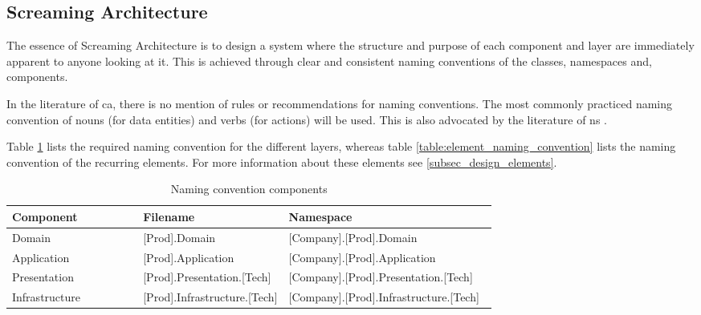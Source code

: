 \subsection{Screaming Architecture}
The essence of Screaming Architecture is to design a system where the structure and
purpose of each component and layer are immediately apparent to anyone looking at it. This
is achieved through clear and consistent naming conventions of the classes, namespaces and,
components.

In the literature of \gls{ca}, there is no mention of rules or recommendations for naming
conventions. The most commonly practiced naming convention of nouns (for data entities)
and verbs (for actions) will be used. This is also advocated by the literature of \gls{ns}
\parencite[357]{mannaert_normalized_2016}.

Table \ref{table:component_naming_convention} lists the required naming convention for the
different layers, whereas table \ref{table:element_naming_convention} lists the naming
convention of the recurring elements. For more information about these elements see
\ref{subsec_design_elements}.

\begin{table}[h]
    \small
    \begin{tabular}{ l p{0.30\linewidth} p{0.43\linewidth} }
    \hline
    \textbf{Component} & \textbf{Filename} & \textbf{Namespace} \\ 
    \hline
    Domain & [Prod].Domain & [Company].[Prod].Domain \\
    Application & [Prod].Application & [Company].[Prod].Application \\
    Presentation & [Prod].Presentation.[Tech] & [Company].[Prod].Presentation.[Tech] \\
    Infrastructure & [Prod].Infrastructure.[Tech] & [Company].[Prod].Infrastructure.[Tech]
    \\ \hline
    \end{tabular}
\caption{Naming convention components}
\label{table:component_naming_convention}
\end{table}


